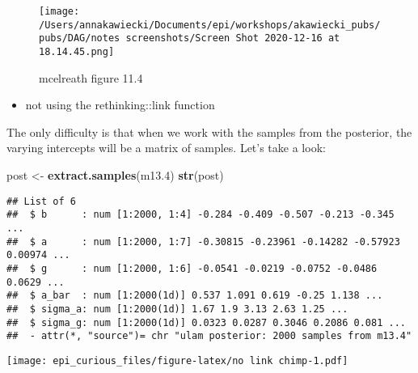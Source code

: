 \documentclass[
]{article}
\newenvironment{Shaded}{\begin{snugshade}}{\end{snugshade}}
\newcommand{\CommentTok}[1]{\textcolor[rgb]{0.56,0.35,0.01}{\textit{#1}}}
\newcommand{\DecValTok}[1]{\textcolor[rgb]{0.00,0.00,0.81}{#1}}
\newcommand{\FloatTok}[1]{\textcolor[rgb]{0.00,0.00,0.81}{#1}}
\newcommand{\KeywordTok}[1]{\textcolor[rgb]{0.13,0.29,0.53}{\textbf{#1}}}
\newcommand{\NormalTok}[1]{#1}
\newcommand{\OperatorTok}[1]{\textcolor[rgb]{0.81,0.36,0.00}{\textbf{#1}}}
\newcommand{\StringTok}[1]{\textcolor[rgb]{0.31,0.60,0.02}{#1}}
\providecommand{\tightlist}{%
  \setlength{\itemsep}{0pt}\setlength{\parskip}{0pt}}
\begin{document}
\begin{figure}
\centering
\texttt{[image: /Users/annakawiecki/Documents/epi/workshops/akawiecki\_pubs/pubs/DAG/notes screenshots/Screen Shot 2020-12-16 at 18.14.45.png]}
\caption{mcelreath figure 11.4}
\end{figure}

\begin{itemize}
\tightlist
\item
  not using the rethinking::link function
\end{itemize}

The only difficulty is that when we work with the samples from the
posterior, the varying intercepts will be a matrix of samples. Let's
take a look:

\begin{Shaded}
\begin{Highlighting}[]
\NormalTok{post <-}\StringTok{ }\KeywordTok{extract.samples}\NormalTok{(m13}\FloatTok{.4}\NormalTok{) }
\KeywordTok{str}\NormalTok{(post)}
\end{Highlighting}
\end{Shaded}

\begin{verbatim}
## List of 6
##  $ b      : num [1:2000, 1:4] -0.284 -0.409 -0.507 -0.213 -0.345 ...
##  $ a      : num [1:2000, 1:7] -0.30815 -0.23961 -0.14282 -0.57923 0.00974 ...
##  $ g      : num [1:2000, 1:6] -0.0541 -0.0219 -0.0752 -0.0486 0.0629 ...
##  $ a_bar  : num [1:2000(1d)] 0.537 1.091 0.619 -0.25 1.138 ...
##  $ sigma_a: num [1:2000(1d)] 1.67 1.9 3.13 2.63 1.25 ...
##  $ sigma_g: num [1:2000(1d)] 0.0323 0.0287 0.3046 0.2086 0.081 ...
##  - attr(*, "source")= chr "ulam posterior: 2000 samples from m13.4"
\end{verbatim}

\begin{Shaded}
\end{Shaded}

\texttt{[image: epi\_curious\_files/figure-latex/no link chimp-1.pdf]}
\end{document}
